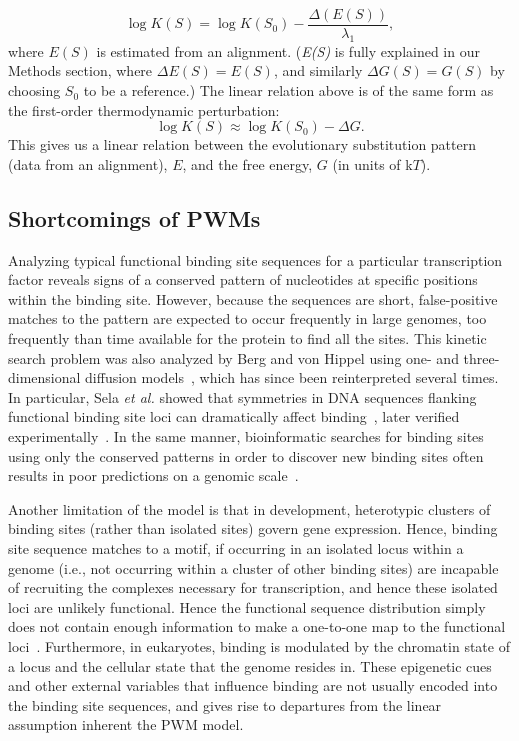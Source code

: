	\begin{equation}\label{bvhke}
	\log{K(S)} = \log{K(S_0)} -\frac{\Delta(E(S))}{\lambda_1},
	  \end{equation}
where $E(S)$ is  estimated from an alignment. (\textit{E(S)} is fully explained in our Methods section, where $\Delta E(S) = E(S)$, and similarly $\Delta G(S) = G(S)$  by choosing $S_0$ to be a reference.) %
The linear relation above is of the same form as the first-order thermodynamic perturbation:
	\begin{equation}
	  \log{K(S)} \approx \log{K(S_0)} -   \Delta G.
	   \end{equation}
	   This gives us a linear relation between the evolutionary substitution pattern (data from an alignment), $E$, and the free energy, $G$ (in units of k$T$).

\subsection{Shortcomings of PWMs}

Analyzing typical functional binding site sequences for a particular transcription factor reveals  signs of a conserved pattern of nucleotides at specific positions within the binding site.  However, because the sequences are short, false-positive matches to the pattern are expected to occur frequently in large genomes, too frequently than time available for the protein to find all the sites.  This kinetic search problem was also analyzed by Berg and von Hippel using one- and three-dimensional diffusion models~\cite{pmid7317363}, which has since been reinterpreted several times.  In particular, Sela \textit{et al.} showed that symmetries in DNA sequences flanking functional binding site loci can dramatically affect binding~\cite{pmid21723826}, later verified experimentally~\cite{pmid25313048}.  In the same manner, bioinformatic searches for binding sites using only the conserved patterns in order to discover new binding sites often results in poor predictions on a genomic scale~\cite{pmid14983022}.  

Another limitation of the model is that in development, heterotypic clusters of binding sites (rather than isolated sites) govern gene expression.  Hence, binding site sequence matches to a motif, if occurring in an isolated locus within a genome (i.e., not occurring within a cluster of other binding sites) are incapable of recruiting the complexes necessary for transcription, and hence these isolated loci are unlikely functional.  Hence the functional sequence distribution simply does not contain enough information to make a one-to-one map to the functional loci~\cite{Schneider.Stephens1990}.  Furthermore, in eukaryotes, binding is modulated by the chromatin state of a locus and the cellular state that the genome resides in.  These epigenetic cues and other external variables that influence binding are not usually encoded into the binding site sequences, and gives rise to departures from the linear assumption inherent the PWM model.  

